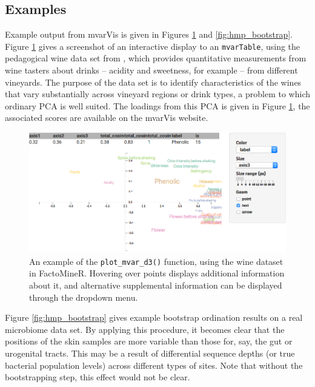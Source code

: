 \subsection{Examples}

Example output from mvarVis is given in Figures \ref{fig:wine_interactive} and
\ref{fig:hmp_bootstrap}. Figure \ref{fig:wine_interactive} gives a screenshot of
an interactive display to an \texttt{mvarTable}, using the pedagogical wine data
set from \cite{le2008factominer}, which provides quantitative measurements from
wine tasters about drinks -- acidity and sweetness, for example -- from
different vineyards. The purpose of the data set is to identify characteristics
of the wines that vary substantially across vineyard regions or drink types, a
problem to which ordinary PCA is well suited. The loadings from this PCA is
given in Figure \ref{fig:wine_interactive}, the associated scores are available
on the mvarVis website.

\begin{figure}[ht]
  \centering
  \includegraphics[width=\textwidth]{figure/treelapse/wine_interactive}
  \caption{ An example of the \texttt{plot\_mvar\_d3()} function, using the wine
    dataset in FactoMineR. Hovering over points displays additional information
    about it, and alternative supplemental information can be displayed through
    the dropdown menu.
    \label{fig:wine_interactive}
  }
\end{figure}

Figure \ref{fig:hmp_bootstrap} gives example bootstrap ordination results on a
real microbiome data set. By applying this procedure, it becomes clear that the
positions of the skin samples are more variable than those for, say, the gut or
urogenital tracts. This may be a result of differential sequence depths (or true
bacterial population levels) across different types of sites. Note that without
the bootstrapping step, this effect would not be clear.

